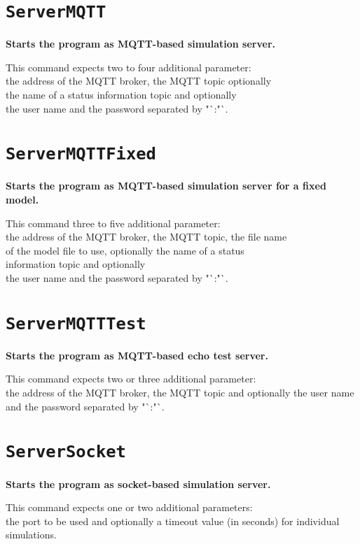 \section{\texttt{ServerMQTT}}

\textbf{Starts the program as MQTT-based simulation server.}

This command expects two to four additional parameter:\\
the address of the MQTT broker, the MQTT topic optionally\\
the name of a status information topic and optionally\\
the user name and the password separated by "`:"`.

\section{\texttt{ServerMQTTFixed}}

\textbf{Starts the program as MQTT-based simulation server for a fixed model.}

This command three to five additional parameter:\\
the address of the MQTT broker, the MQTT topic, the file name\\
of the model file to use, optionally the name of a status\\
information topic and optionally\\
the user name and the password separated by "`:"`.

\section{\texttt{ServerMQTTTest}}

\textbf{Starts the program as MQTT-based echo test server.}

This command expects two or three additional parameter:\\
the address of the MQTT broker, the MQTT topic and optionally the user name and the password separated by "`:"`.

\section{\texttt{ServerSocket}}

\textbf{Starts the program as socket-based simulation server.}

This command expects one or two additional parameters:\\
the port to be used and optionally a timeout value (in seconds) for individual simulations.

